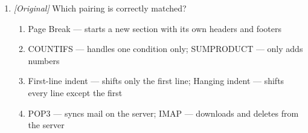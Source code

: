 \begin{enumerate}[label=\textbf{Q\arabic*.}, leftmargin=*]
\begin{enumerate}[label=\Alph*.]
    \item II and III only
    \item I, II, and III
  \end{enumerate}
\item \textit{[Original]} Which pairing is correctly matched?
  \begin{enumerate}[label=\Alph*.]
    \item Page Break --- starts a new section with its own headers and
      footers
    \item COUNTIFS --- handles one condition only; SUMPRODUCT --- only adds
      numbers
    \item First-line indent --- shifts only the first line; Hanging indent
      --- shifts every line except the first
    \item POP3 --- syncs mail on the server; IMAP --- downloads and deletes
      from the server
  \end{enumerate}


\end{enumerate}
